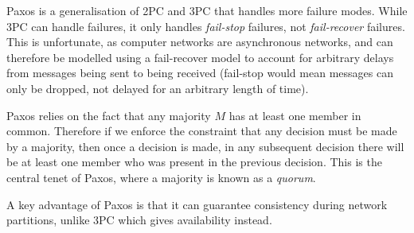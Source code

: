 \documentclass[12pt,twoside,notitlepage]{report}
\begin{document}
%
%

Paxos is a generalisation of 2PC and 3PC that handles more failure modes. While 3PC can handle
failures, it only handles \emph{fail-stop} failures, not \emph{fail-recover} failures. This is
unfortunate, as computer networks are asynchronous networks, and can therefore be modelled using a
fail-recover model to account for arbitrary delays from messages being sent to being received
(fail-stop would mean messages can only be dropped, not delayed for an arbitrary length of time).

Paxos relies on the fact that any majority $M$ has at least one member in common. Therefore if we
enforce the constraint that any decision must be made by a majority, then once a decision is made,
in any subsequent decision there will be at least one member who was present in the previous
decision. This is the central tenet of Paxos, where a majority is known as a \emph{quorum}.

A key advantage of Paxos is that it can guarantee consistency during network partitions,
unlike 3PC which gives availability instead.
\end{document}
